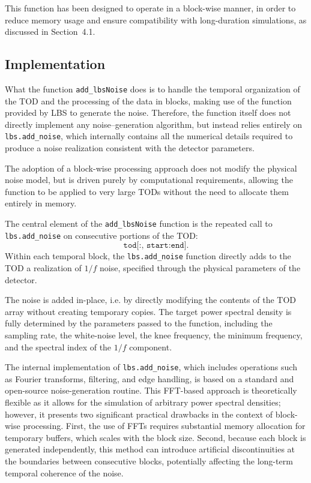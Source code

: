 This function has been designed to operate in a block-wise manner, in order to reduce memory usage and ensure compatibility with long-duration simulations, as discussed in Section~4.1. 


\subsection{Implementation}

What the function \texttt{add\_lbsNoise} does is to handle the temporal organization of the TOD and the processing of the data in blocks, making use of the function provided by LBS to generate the noise. Therefore, the function itself does not directly implement any noise–generation algorithm, but instead relies entirely on \texttt{lbs.add\_noise}, which internally contains all the numerical details required to produce a noise realization consistent with the detector parameters.

The adoption of a block-wise processing approach does not modify the physical noise model, but is driven purely by computational requirements, allowing the function to be applied to very large TODs without the need to allocate them entirely in memory.

The central element of the \texttt{add\_lbsNoise} function is the repeated call to \texttt{lbs.add\_noise} on consecutive portions of the TOD:
\[
\texttt{tod[:, start:end]}.
\]
Within each temporal block, the \texttt{lbs.add\_noise} function directly adds to the TOD a realization of $1/f$ noise, specified through the physical parameters of the detector.

The noise is added in-place, i.e. by directly modifying the contents of the TOD array without creating temporary copies. The target power spectral density is fully determined by the parameters passed to the function, including the sampling rate, the white-noise level, the knee frequency, the minimum frequency, and the spectral index of the $1/f$ component.

The internal implementation of \texttt{lbs.add\_noise}, which includes operations such as Fourier transforms, filtering, and edge handling, is based on a standard and open-source noise-generation routine. This FFT-based approach is theoretically flexible as it allows for the simulation of arbitrary power spectral densities; however, it presents two significant practical drawbacks in the context of block-wise processing. First, the use of FFTs requires substantial memory allocation for temporary buffers, which scales with the block size. Second, because each block is generated independently, this method can introduce artificial discontinuities at the boundaries between consecutive blocks, potentially affecting the long-term temporal coherence of the noise.

